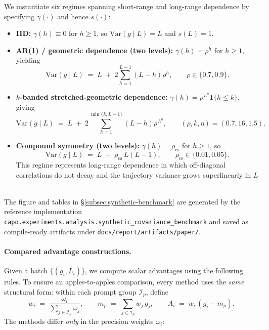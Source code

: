 We instantiate six regimes spanning short-range and long-range dependence by specifying \(\gamma(\cdot)\) and hence \(s(\cdot)\):
\begin{itemize}
  \item \textbf{IID:} \(\gamma(h)\equiv 0\) for \(h\ge 1\), so \(\mathrm{Var}(g\mid L)=L\) and \(s(L)=1\).
  \item \textbf{AR(1) / geometric dependence (two levels):} \(\gamma(h)=\rho^{h}\) for \(h\ge 1\), yielding
  \begin{equation}
    \mathrm{Var}(g\mid L)
    \;=\;
    L \;+\; 2\sum_{h=1}^{L-1}(L-h)\rho^{h},
    \qquad
    \rho\in\{0.7,0.9\}.
    \label{eq:synth_vL_ar1}
  \end{equation}
  \item \textbf{$k$-banded stretched-geometric dependence:} \(\gamma(h)=\rho^{\,h^{\eta}}\mathbf 1\{h\le k\}\), giving
  \begin{equation}
    \mathrm{Var}(g\mid L)
    \;=\;
    L \;+\; 2\sum_{h=1}^{\min\{k,L-1\}}(L-h)\rho^{\,h^{\eta}},
    \qquad
    (\rho,k,\eta)=(0.7,16,1.5).
    \label{eq:synth_vL_kband}
  \end{equation}
  \item \textbf{Compound symmetry (two levels):} \(\gamma(h)=\rho_{\mathrm{cs}}\) for \(h\ge 1\), so
  \begin{equation}
    \mathrm{Var}(g\mid L)
    \;=\;
    L \;+\; \rho_{\mathrm{cs}}\,L(L-1),
    \qquad
    \rho_{\mathrm{cs}}\in\{0.01,0.05\}.
    \label{eq:synth_vL_cs}
  \end{equation}
  This regime represents long-range dependence in which off-diagonal correlations do not decay and the trajectory variance grows superlinearly in \(L\).
\end{itemize}
The figure and tables in \S\ref{subsec:synthetic-benchmark} are generated by the reference implementation \texttt{capo.experiments.analysis.synthetic\_covariance\_benchmark} and saved as compile-ready artifacts under \texttt{docs/report/artifacts/paper/}.

\paragraph{Compared advantage constructions.}
Given a batch \(\{(g_i,L_i)\}\), we compute scalar advantages using the following rules.
To ensure an apples-to-apples comparison, every method uses the \emph{same} structural form: within each prompt group \(\mathcal I_p\), define
\begin{equation}
  w_i \;=\; \frac{\omega_i}{\sum_{j\in\mathcal I_p} \omega_j},
  \qquad
  m_p \;=\; \sum_{j\in\mathcal I_p} w_j\, g_j,
  \qquad
  A_i \;=\; w_i\,(g_i - m_p).
  \label{eq:synth_unified_adv}
\end{equation}
The methods differ \emph{only} in the precision weights \(\omega_i\):

